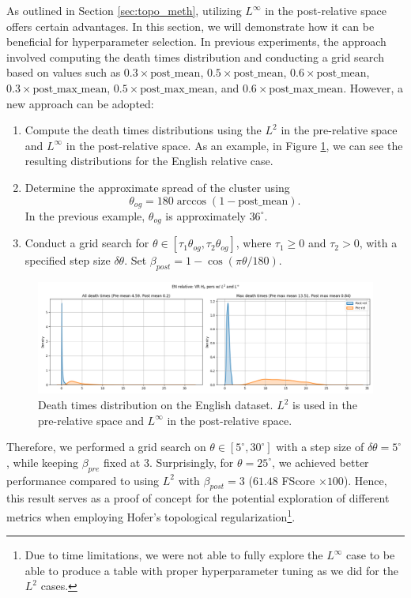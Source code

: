 \documentclass[../main.tex]{subfiles}
\begin{document}
As outlined in Section \ref{sec:topo_meth}, utilizing $L^\infty$ in the post-relative space offers certain advantages. In this section, we will demonstrate how it can be beneficial for hyperparameter selection. In previous experiments, the approach involved computing the death times distribution and conducting a grid search based on values such as $0.3\times \text{post\_mean}$, $0.5\times \text{post\_mean}$, $0.6\times \text{post\_mean}$, $0.3\times \text{post\_max\_mean}$, $0.5\times \text{post\_max\_mean}$, and $0.6\times \text{post\_max\_mean}$. However, a new approach can be adopted:
\begin{enumerate}
    \item Compute the death times distributions using the $L^2$ in the pre-relative space and $L^\infty$ in the post-relative space. As an example, in Figure \ref{fig:distMix}, we can see the resulting distributions for the English relative case.

    \item Determine the approximate spread of the cluster using
    \[\theta_{og} = 180 \arccos(1-\text{post\_mean}).\]
    In the previous example, $\theta_{og}$ is approximately $36^{\circ}$.
    
    \item Conduct a grid search for $\theta \in [\tau_1 \theta_{og}, \tau_2\theta_{og}]$, where $\tau_1\geq 0$ and $\tau_2> 0$, with a specified step size $\delta \theta$. Set $\beta_{post} = 1-\cos(\pi \theta / 180)$.
\end{enumerate}

\begin{figure}[!ht]
    \centering
    \includegraphics[width=\textwidth]{figures/rs/stitching/mix_en_relative_seed0.png} 
    \caption{Death times distribution on the English dataset. $L^2$ is used in the pre-relative space and $L^\infty$ in the post-relative space.}
    \label{fig:distMix}
\end{figure}

Therefore, we performed a grid search on $\theta \in [5^{\circ}, 30^{\circ}]$ with a step size of $\delta \theta = 5^{\circ}$, while keeping $\beta_{pre}$ fixed at 3. Surprisingly, for $\theta = 25^{\circ}$, we achieved better performance compared to using $L^2$ with $\beta_{post} = 3$ ($61.48$ FScore $\times 100$). Hence, this result serves as a proof of concept for the potential exploration of different metrics when employing Hofer's topological regularization\footnote{Due to time limitations, we were not able to fully explore the $L^\infty$ case to be able to produce a table with proper hyperparameter tuning as we did for the $L^2$ cases.}.
\end{document}
